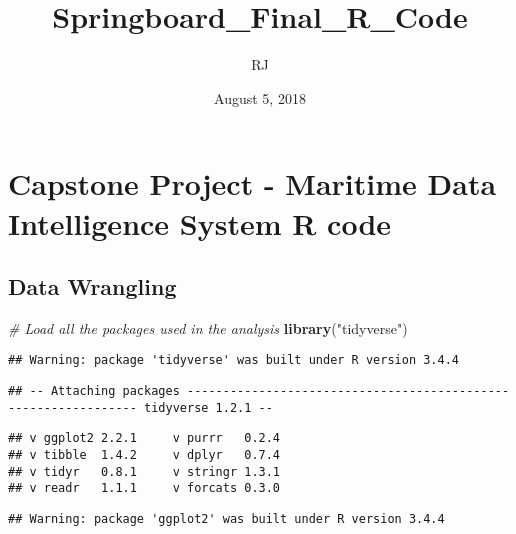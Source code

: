 \documentclass[]{article}
\title{Springboard\_Final\_R\_Code}
\author{RJ}
\date{August 5, 2018}
\newenvironment{Shaded}{\begin{snugshade}}{\end{snugshade}}
\newcommand{\KeywordTok}[1]{\textcolor[rgb]{0.13,0.29,0.53}{\textbf{#1}}}
\newcommand{\DataTypeTok}[1]{\textcolor[rgb]{0.13,0.29,0.53}{#1}}
\newcommand{\StringTok}[1]{\textcolor[rgb]{0.31,0.60,0.02}{#1}}
\newcommand{\CommentTok}[1]{\textcolor[rgb]{0.56,0.35,0.01}{\textit{#1}}}
\newcommand{\OtherTok}[1]{\textcolor[rgb]{0.56,0.35,0.01}{#1}}
\newcommand{\OperatorTok}[1]{\textcolor[rgb]{0.81,0.36,0.00}{\textbf{#1}}}
\newcommand{\NormalTok}[1]{#1}
\begin{document}
\maketitle

\begin{Shaded}
\end{Shaded}

\section{Capstone Project - Maritime Data Intelligence System R
code}\label{capstone-project---maritime-data-intelligence-system-r-code}

\subsection{Data Wrangling}\label{data-wrangling}

\begin{Shaded}
\begin{Highlighting}[]
\CommentTok{# Load all the packages used in the analysis}
\KeywordTok{library}\NormalTok{(}\StringTok{"tidyverse"}\NormalTok{)}
\end{Highlighting}
\end{Shaded}

\begin{verbatim}
## Warning: package 'tidyverse' was built under R version 3.4.4
\end{verbatim}

\begin{verbatim}
## -- Attaching packages --------------------------------------------------------------- tidyverse 1.2.1 --
\end{verbatim}

\begin{verbatim}
## v ggplot2 2.2.1     v purrr   0.2.4
## v tibble  1.4.2     v dplyr   0.7.4
## v tidyr   0.8.1     v stringr 1.3.1
## v readr   1.1.1     v forcats 0.3.0
\end{verbatim}

\begin{verbatim}
## Warning: package 'ggplot2' was built under R version 3.4.4
\end{verbatim}
\end{document}
